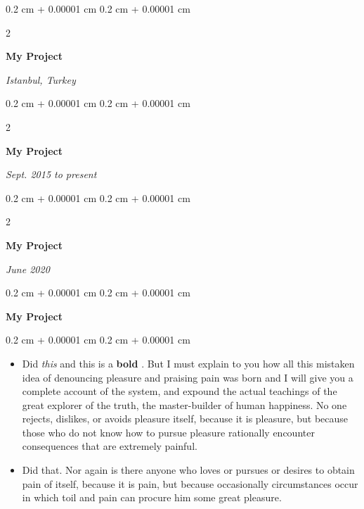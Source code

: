 \documentclass[10pt, letterpaper]{article}
\newenvironment{highlights}{
    \begin{itemize}[
        topsep=0.10 cm,
        parsep=0.10 cm,
        partopsep=0pt,
        itemsep=0pt,
        leftmargin=0.4 cm + 10pt
    ]
}{
    \end{itemize}
} %
\newenvironment{onecolentry}{
    \begin{adjustwidth}{
        0.2 cm + 0.00001 cm
    }{
        0.2 cm + 0.00001 cm
    }
}{
    \end{adjustwidth}
} %
\newenvironment{twocolentry}[2][]{
    \onecolentry
    \def\secondColumn{#2}
    \setcolumnwidth{\fill, 4.5 cm}
    \begin{paracol}{2}
}{
    \switchcolumn \raggedleft \secondColumn
    \end{paracol}
    \endonecolentry
} %
\let\hrefWithoutArrow\href
\renewcommand{\href}[2]{\hrefWithoutArrow{#1}{\mbox{\ifthenelse{\equal{#2}{}}{ }{#2 }\raisebox{.15ex}{\footnotesize \faExternalLink*}}}}
\begin{document}
        \vspace{0.2 cm-3px}

        \begin{twocolentry}{
        \textit{Istanbul, Turkey}    
            
        }
            \textbf{My Project}
        \end{twocolentry}



        \vspace{0.2 cm-3px}

        \begin{twocolentry}{
            
            
        \textit{Sept. 2015 to present}}
            \textbf{My Project}
        \end{twocolentry}



        \vspace{0.2 cm-3px}

        \begin{twocolentry}{
            
            
        \textit{June 2020}}
            \textbf{My Project}
        \end{twocolentry}



        \vspace{0.2 cm-3px}

        \begin{onecolentry}
            \textbf{My Project}
        \end{onecolentry}

        \vspace{0.10 cm-3px}
        \begin{onecolentry}
            \begin{highlights}
                \item Did \textit{this} and this is a \textbf{bold} \href{https://example.com}{link}. But I must explain to you how all this mistaken idea of denouncing pleasure and praising pain was born and I will give you a complete account of the system, and expound the actual teachings of the great explorer of the truth, the master-builder of human happiness. No one rejects, dislikes, or avoids pleasure itself, because it is pleasure, but because those who do not know how to pursue pleasure rationally encounter consequences that are extremely painful.
                \item Did that. Nor again is there anyone who loves or pursues or desires to obtain pain of itself, because it is pain, but because occasionally circumstances occur in which toil and pain can procure him some great pleasure.
            \end{highlights}
        \end{onecolentry}
\end{document}
